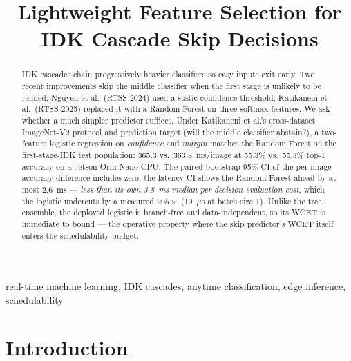 \documentclass[conference]{IEEEtran}
\begin{document}
\title{Lightweight Feature Selection for IDK Cascade Skip Decisions}

\author{
}

\maketitle

\begin{abstract}
IDK cascades chain progressively heavier classifiers so easy inputs exit early. Two recent improvements skip the middle classifier when the first stage is unlikely to be refined: Nguyen et al.\ (RTSS 2024) used a static confidence threshold; Katikaneni et al.\ (RTSS 2025) replaced it with a Random Forest on three softmax features. We ask whether a much simpler predictor suffices. Under Katikaneni et al.'s cross-dataset ImageNet-V2 protocol and prediction target (will the middle classifier abstain?), a two-feature logistic regression on \textit{confidence} and \textit{margin} matches the Random Forest on the first-stage-IDK test population: 365.3 vs.\ 363.8~ms/image at 55.3\% vs.\ 55.3\% top-1 accuracy on a Jetson Orin Nano CPU. The paired bootstrap 95\% CI of the per-image accuracy difference includes zero; the latency CI shows the Random Forest ahead by at most 2.6~ms --- \emph{less than its own 3.8~ms median per-decision evaluation cost}, which the logistic undercuts by a measured $205\times$ (19~$\mu$s at batch size 1). Unlike the tree ensemble, the deployed logistic is branch-free and data-independent, so its WCET is immediate to bound --- the operative property where the skip predictor's WCET itself enters the schedulability budget.
\end{abstract}

\begin{IEEEkeywords}
real-time machine learning, IDK cascades, anytime classification, edge inference, schedulability
\end{IEEEkeywords}

\section{Introduction}
\label{sec:intro}
\end{document}
